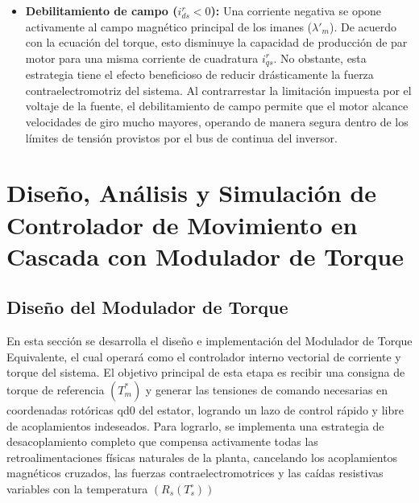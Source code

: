 \documentclass[12pt, a4paper,journal, onecolumn, compsoc]{IEEEtran}
\begin{document}
\begin{itemize}
\begin{itemize}
    \item \textbf{Debilitamiento de campo ($i_{ds}^r < 0$):} Una corriente negativa se opone activamente al campo magnético principal de los imanes ($\lambda'_m$). De acuerdo con la ecuación del torque, esto disminuye la capacidad de producción de par motor para una misma corriente de cuadratura $i_{qs}^r$. No obstante, esta estrategia tiene el efecto beneficioso de reducir drásticamente la fuerza contraelectromotriz del sistema. Al contrarrestar la limitación impuesta por el voltaje de la fuente, el debilitamiento de campo permite que el motor alcance velocidades de giro mucho mayores, operando de manera segura dentro de los límites de tensión provistos por el bus de continua del inversor.
\end{itemize}
\end{itemize}



\section{Diseño, Análisis y Simulación de Controlador de Movimiento en Cascada con Modulador de Torque}
\subsection{Diseño del Modulador de Torque}

En esta sección se desarrolla el diseño e implementación del Modulador de Torque Equivalente, el cual operará como el controlador interno vectorial de corriente y torque del sistema. El objetivo principal de esta etapa es recibir una consigna de torque de referencia $(T_m^*)$ y generar las tensiones de comando necesarias en coordenadas rotóricas qd0 del estator, logrando un lazo de control rápido y libre de acoplamientos indeseados. Para lograrlo, se implementa una estrategia de desacoplamiento completo que compensa activamente todas las retroalimentaciones físicas naturales de la planta, cancelando los acoplamientos magnéticos cruzados, las fuerzas contraelectromotrices y las caídas resistivas variables con la temperatura $(R_s(T_s^\circ))$
\end{document}
